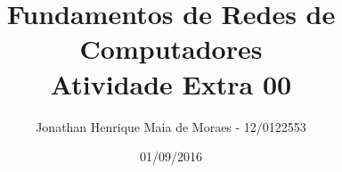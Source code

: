 \title{Fundamentos de Redes de Computadores \\ Atividade Extra 00}
\author{Jonathan Henrique Maia de Moraes - 12/0122553}
\date{01/09/2016}
\maketitle

